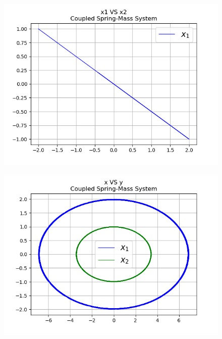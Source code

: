 \documentclass{article}
\begin{document}
\begin{figure}[h]
\centering
\includegraphics[scale=0.4]{r5.png}
\label{figure: Resortes acoplados }
\end{figure}

\begin{figure}[h]
\centering
\includegraphics[scale=0.4]{r6.png}
\label{figure: Resortes acoplados }
\end{figure}
\end{document}

